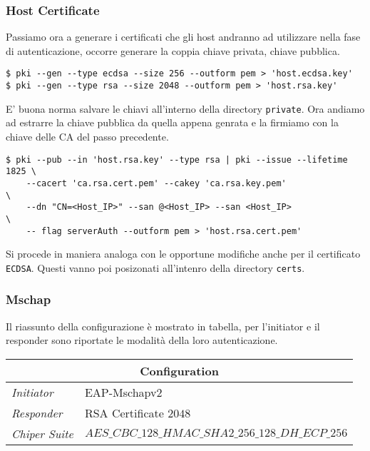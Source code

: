 \documentclass[
10pt, %
a4paper, %
oneside, %
headinclude,footinclude, %
BCOR5mm, %
]{scrartcl}
\begin{document}
\subsubsection*{Host Certificate}
Passiamo ora a generare i certificati che gli host andranno ad utilizzare nella fase di autenticazione, occorre generare la coppia chiave privata, chiave pubblica.
\vspace*{0.2cm}
\begin{lstlisting}
$ pki --gen --type ecdsa --size 256 --outform pem > 'host.ecdsa.key'
$ pki --gen --type rsa --size 2048 --outform pem > 'host.rsa.key'
\end{lstlisting} 

\vspace*{0.2cm}
\noindent
E' buona norma salvare le chiavi all'interno della directory \lstinline|private|. Ora andiamo ad estrarre la chiave pubblica 
da quella appena genrata e la firmiamo con la chiave delle CA del passo precedente.
\begin{lstlisting}
$ pki --pub --in 'host.rsa.key' --type rsa | pki --issue --lifetime 1825 \
    --cacert 'ca.rsa.cert.pem' --cakey 'ca.rsa.key.pem'                  \
    --dn "CN=<Host_IP>" --san @<Host_IP> --san <Host_IP>                 \
    -- flag serverAuth --outform pem > 'host.rsa.cert.pem'
\end{lstlisting}

\noindent
Si procede in maniera analoga con le opportune modifiche anche per il certificato \lstinline|ECDSA|. Questi vanno poi posizonati all'intenro della
directory \lstinline|certs|.

\subsubsection{Mschap}
Il riassunto della configurazione è mostrato in tabella, per l'initiator e il responder sono riportate le modalità della loro autenticazione.
\begin{center}
    \setlength{\arrayrulewidth}{0.4mm}
    \renewcommand{\arraystretch}{1.3}
    \begin{tabular}{|l|l|}
        \hline
        \multicolumn{2}{|c|}{\textbf{Configuration}} \\
        \hline
        \textit{Initiator} & EAP-Mschapv2 \\
        \textit{Responder} & RSA Certificate $2048$ \\
        \textit{Chiper Suite} & $AES\_CBC\_128\_HMAC\_SHA2\_256\_128\_DH\_ECP\_256$ \\
        \hline
    \end{tabular}
\end{center}
\end{document}
